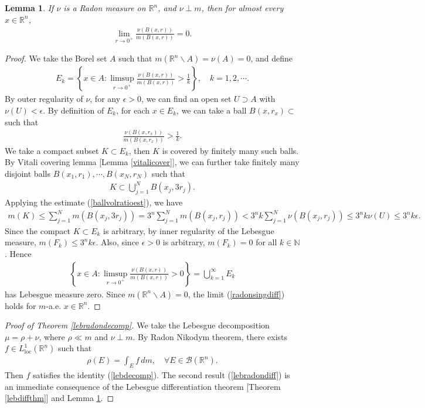 \documentclass{article}
\numberwithin{equation}{section}
\newcommand{\bbN}{\mathbb{N}}
\newcommand{\bbR}{\mathbb{R}}
\newcommand{\scr}{\mathscr}
\newcommand{\loc}{\mathrm{loc}}
\theoremstyle{plain}
\newtheorem{lemma}[theorem]{Lemma}
\theoremstyle{definition}
\begin{document}
\begin{lemma}\label{radonsingdifflemma}
If $\nu$ is a Radon measure on $\bbR^n$, and $\nu\perp m$, then for almost every $x\in\bbR^n$,
\begin{align}
	\lim_{r\to 0^+}\frac{\nu(B(x,r))}{m(B(x,r))}=0.\label{radonsingdiff}
\end{align}
\end{lemma}
\begin{proof}
We take the Borel set $A$ such that $m(\bbR^n\backslash A)=\nu(A)=0$, and define
\begin{align*}
E_k=\left\{x\in A:\limsup_{r\to 0^+}\frac{\nu(B(x,r))}{m(B(x,r))}>\frac{1}{k}\right\},\quad k=1,2,\cdots.
\end{align*}
By outer regularity of $\nu$, for any $\epsilon>0$, we can find an open set $U\supset A$ with $\nu(U)<\epsilon$. By definition of $E_k$, for each $x\in E_k$, we can take a ball $B(x,r_x)\subset$ such that
\begin{align}
	\frac{\nu(B(x,r_x))}{m(B(x,r_x))}>\frac{1}{k}.\label{ballvolratioest}
\end{align}
We take a compact subset $K\subset E_k$, then $K$ is covered by finitely many such balls. By Vitali covering lemma [Lemma \ref{vitalicover}], we can further take finitely many disjoint balls $B(x_1,r_1),\cdots,B(x_N,r_N)$ such that
\begin{align*}
	K\subset\bigcup_{j=1}^N B(x_j,3r_j).
\end{align*}
Applying the estimate (\ref{ballvolratioest}), we have
\begin{align*}
	m(K)\leq \sum_{j=1}^Nm(B(x_j,3r_j))=3^n\sum_{j=1}^Nm(B(x_j,r_j))< 3^nk\sum_{j=1}^N\nu(B(x_j,r_j))\leq 3^nk\nu(U)\leq 3^nk\epsilon.
\end{align*}
Since the compact $K\subset E_k$ is arbitrary, by inner regularity of the Lebesgue measure, $m(F_k)\leq 3^nk\epsilon$. Also, since $\epsilon>0$ is arbitrary, $m(F_k)=0$ for all $k\in\bbN$. Hence
\begin{align*}
\left\{x\in A:\limsup_{r\to 0^+}\frac{\nu(B(x,r))}{m(B(x,r))}>0\right\}=\bigcup_{k=1}^\infty E_k
\end{align*}
has Lebesgue measure zero. Since $m(\bbR^n\backslash A)=0$, the limit (\ref{radonsingdiff}) holds for $m$-a.e. $x\in\bbR^n$.
\end{proof}
\begin{proof}[Proof of Theorem \ref{lebradondecomp}]
We take the Lebesgue decomposition $\mu=\rho+\nu$, where $\rho\ll m$ and $\nu\perp m$. By Radon Nikodym theorem, there exists $f\in L_\loc^1(\bbR^n)$ such that
\begin{align*}
	\rho(E)=\int_E f\,dm,\quad\forall E\in\scr{B}(\bbR^n).
\end{align*}
Then $f$ satisfies the identity (\ref{lebdecomp}). The second result (\ref{lebradondiff}) is an immediate consequence of the Lebesgue differentiation theorem [Theorem \ref{lebdiffthm}] and Lemma \ref{radonsingdifflemma}.
\end{proof}
\end{document}
